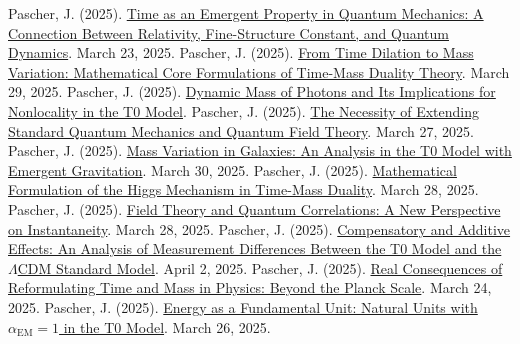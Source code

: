 \documentclass[a4paper,12pt]{article}
\newcommand{\alphaEM}{\alpha_{\text{EM}}}
\begin{document}
	\begin{thebibliography}{99}
		 Pascher, J. (2025). \href{https://github.com/jpascher/T0-Time-Mass-Duality/tree/main/2/pdf/English/ZeitEmergentQMEn.pdf}{Time as an Emergent Property in Quantum Mechanics: A Connection Between Relativity, Fine-Structure Constant, and Quantum Dynamics}. March 23, 2025.
		 Pascher, J. (2025). \href{https://github.com/jpascher/T0-Time-Mass-Duality/tree/main/2/pdf/English/MathZeitMasseLagrangeEn.pdf}{From Time Dilation to Mass Variation: Mathematical Core Formulations of Time-Mass Duality Theory}. March 29, 2025.
		 Pascher, J. (2025). \href{https://github.com/jpascher/T0-Time-Mass-Duality/tree/main/2/pdf/English/DynMassePhotonenNichtlokalEn.pdf}{Dynamic Mass of Photons and Its Implications for Nonlocality in the T0 Model}.
		 Pascher, J. (2025). \href{https://github.com/jpascher/T0-Time-Mass-Duality/tree/main/2/pdf/English/NotwendigkeitQMErweiterungEn.pdf}{The Necessity of Extending Standard Quantum Mechanics and Quantum Field Theory}. March 27, 2025.
		 Pascher, J. (2025). \href{https://github.com/jpascher/T0-Time-Mass-Duality/tree/main/2/pdf/English/MassVarGalaxienEn.pdf}{Mass Variation in Galaxies: An Analysis in the T0 Model with Emergent Gravitation}. March 30, 2025.
		 Pascher, J. (2025). \href{https://github.com/jpascher/T0-Time-Mass-Duality/tree/main/2/pdf/English/MathHiggsZeitMasseEn.pdf}{Mathematical Formulation of the Higgs Mechanism in Time-Mass Duality}. March 28, 2025.
		 Pascher, J. (2025). \href{https://github.com/jpascher/T0-Time-Mass-Duality/tree/main/2/pdf/English/FeldtheorieQuantenEn.pdf}{Field Theory and Quantum Correlations: A New Perspective on Instantaneity}. March 28, 2025.
		 Pascher, J. (2025). \href{https://github.com/jpascher/T0-Time-Mass-Duality/tree/main/2/pdf/English/MessdifferenzenT0StandardEn.pdf}{Compensatory and Additive Effects: An Analysis of Measurement Differences Between the T0 Model and the \(\Lambda\)CDM Standard Model}. April 2, 2025.
		 Pascher, J. (2025). \href{https://github.com/jpascher/T0-Time-Mass-Duality/tree/main/2/pdf/English/JenseitsPlanckEn.pdf}{Real Consequences of Reformulating Time and Mass in Physics: Beyond the Planck Scale}. March 24, 2025.
		 Pascher, J. (2025). \href{https://github.com/jpascher/T0-Time-Mass-Duality/tree/main/2/pdf/English/NatEinheitenAlpha1En.pdf}{Energy as a Fundamental Unit: Natural Units with \(\alphaEM = 1\) in the T0 Model}. March 26, 2025.

\end{thebibliography}
\end{document}
